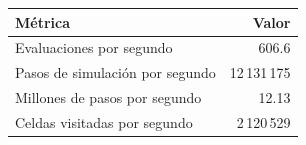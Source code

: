 \begin{tabular}{lr}
\toprule
M\'etrica & Valor \\
\midrule
Evaluaciones por segundo & 606.6 \\
Pasos de simulaci\'on por segundo & 12\,131\,175 \\
Millones de pasos por segundo & 12.13 \\
Celdas visitadas por segundo & 2\,120\,529 \\
\bottomrule
\end{tabular}
